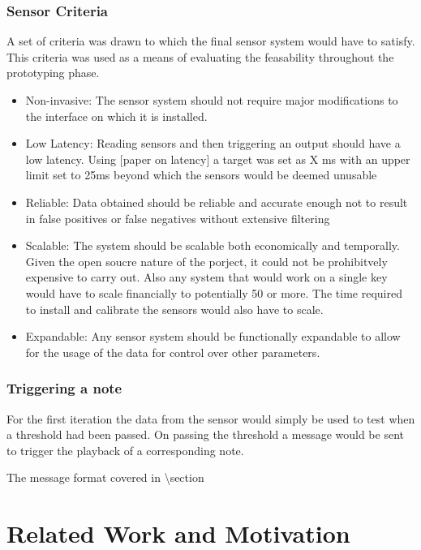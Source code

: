 \subsubsection{Sensor Criteria}\label{sensor-criteria}

A set of criteria was drawn to which the final sensor system would have
to satisfy. This criteria was used as a means of evaluating the
feasability throughout the prototyping phase.

\begin{itemize}
\tightlist
\item
  Non-invasive: The sensor system should not require major modifications
  to the interface on which it is installed.
\item
  Low Latency: Reading sensors and then triggering an output should have
  a low latency. Using {[}paper on latency{]} a target was set as X ms
  with an upper limit set to 25ms beyond which the sensors would be
  deemed unusable
\item
  Reliable: Data obtained should be reliable and accurate enough not to
  result in false positives or false negatives without extensive
  filtering
\item
  Scalable: The system should be scalable both economically and
  temporally. Given the open soucre nature of the porject, it could not
  be prohibitvely expensive to carry out. Also any system that would
  work on a single key would have to scale financially to potentially 50
  or more. The time required to install and calibrate the sensors would
  also have to scale.
\item
  Expandable: Any sensor system should be functionally expandable to
  allow for the usage of the data for control over other parameters.
\end{itemize}

\subsubsection{Triggering a note}\label{triggering-a-note}

For the first iteration the data from the sensor would simply be used to
test when a threshold had been passed. On passing the threshold a
message would be sent to trigger the playback of a corresponding note.

The message format covered in \textbackslash section

\section{Related Work and Motivation}\label{related-work-and-motivation}

